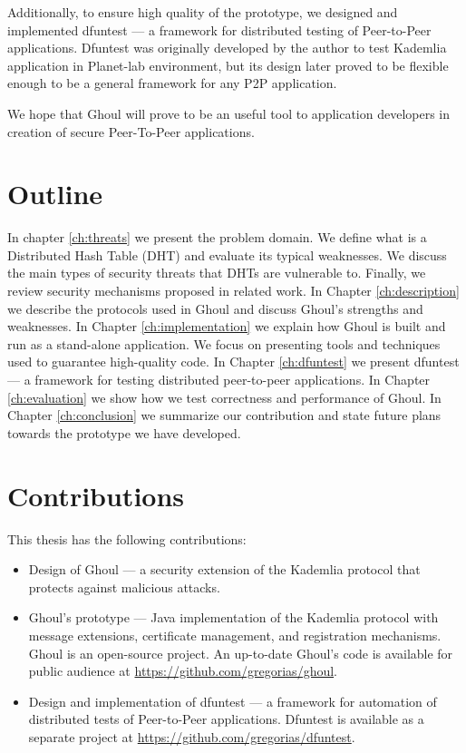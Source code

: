 Additionally, to ensure high quality of the prototype, we designed and
implemented dfuntest --- a framework for distributed testing of Peer-to-Peer
applications.
Dfuntest was originally developed by the author to test Kademlia application in
Planet-lab environment, but its design later proved to be flexible enough to be
a general framework for any P2P application.

We hope that Ghoul will prove to be an useful tool to application developers in
creation of secure Peer-To-Peer applications.

\section{Outline}
In chapter \ref{ch:threats} we present the problem domain.
We define what is a Distributed Hash Table (DHT) and evaluate its typical
weaknesses.
We discuss the main types of security threats that DHTs are vulnerable to.
Finally, we review security mechanisms proposed in related work.
In Chapter \ref{ch:description} we describe the protocols used in Ghoul and
discuss Ghoul's strengths and weaknesses.
In Chapter \ref{ch:implementation} we explain how Ghoul is built and run as a
stand-alone application.
We focus on presenting tools and techniques used to guarantee high-quality code.
In Chapter \ref{ch:dfuntest} we present dfuntest --- a framework for testing
distributed peer-to-peer applications.
In Chapter \ref{ch:evaluation} we show how we test correctness and
performance of Ghoul.
In Chapter \ref{ch:conclusion} we summarize our contribution and state future
plans towards the prototype we have developed.

\section{Contributions}
This thesis has the following contributions:
\begin{itemize}
  \item Design of Ghoul --- a security extension of the Kademlia protocol that
    protects against malicious attacks.
  \item Ghoul's prototype --- Java implementation of the Kademlia protocol with
    message extensions, certificate management, and registration mechanisms.
    Ghoul is an open-source project.
    An up-to-date Ghoul's code is available for public audience at \url{https://github.com/gregorias/ghoul}.
  \item Design and implementation of dfuntest --- a framework for automation of
    distributed tests of Peer-to-Peer applications.
    Dfuntest is available as a separate project at
    \url{https://github.com/gregorias/dfuntest}.
\end{itemize}
